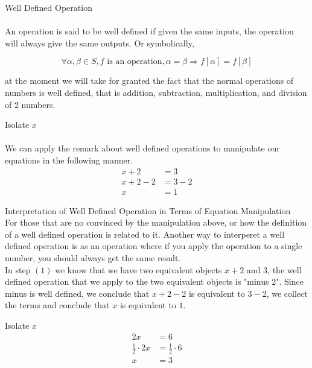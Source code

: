 \documentclass{book}
\begin{document}
  {\remark Well Defined Operation \\\\
    \noindent An operation is said to be well defined if given the same inputs, the operation will always give the same outputs. Or symbolically,

    $$\forall \alpha, \beta \in S, f \text{ is an operation}, \alpha = \beta \Rightarrow f[\alpha] = f[\beta]$$

    \noindent at the moment we will take for granted the fact that the normal operations of numbers is well defined, that is addition, subtraction, multiplication, and division of 2 numbers.\\
  }

  {\example Isolate $x$ \\\\
    \noindent We can apply the remark about well defined operations to manipulate our equations in the following manner.
    \begin{align}
      x + 2 & = 3\\
      x + 2 - 2 & = 3 - 2\\
      x & = 1
    \end{align}
  }

  {\remark Interpretation of Well Defined Operation in Terms of Equation Manipulation \\
    For those that are no convinced by the manipulation above, or how the definition of a well defined operation is related to it. Another way to interperet a well defined operation is as an operation where if you apply the operation to a single number, you should always get the same result.\\

    \noindent In step $(1)$ we know that we have two equivalent objects $x + 2$ and $3$, the well defined operation that we apply to the two equivalent objects is "minus 2". Since minus is well defined, we conclude that $x + 2 - 2$ is equivalent to $3 - 2$, we collect the terms and conclude that $x$ is equivalent to $1$.
  }
  \pagebreak

  {\example Isolate $x$ \\
    \begin{align*}
      2x & = 6\\
      \frac{1}{2} \cdot 2x & = \frac{1}{2} \cdot 6\\
      x & = 3
    \end{align*}
  }
\end{document}
